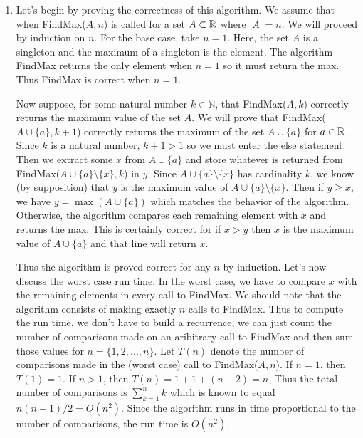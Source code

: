 \documentclass[11pt]{article}
\begin{document}
\begin{enumerate}

\item Let's begin by proving the correctness of this algorithm.
We assume that when FindMax($A, n$) is called for a set $A \subset \mathbb{R}$ where $|A| = n$.
We will proceed by induction on $n$.
For the base case, take $n = 1$.
Here, the set $A$ is a singleton and the maximum of a singleton is the element.
The algorithm FindMax returns the only element when $n=1$ so it must return the max.
Thus FindMax is correct when $n=1$.

Now suppose, for some natural number $k \in \mathbb{N}$, that FindMax($A, k$) correctly returns the maximum value of the set $A$.
We will prove that FindMax($A \cup \{ a \}, k+1$) correctly returns the maximum of the set $A \cup \{ a \}$ for $a \in \mathbb{R}$.
Since $k$ is a natural number, $k+1 > 1$ so we must enter the else statement.
Then we extract some $x$ from $A \cup \{ a \}$ and store whatever is returned from FindMax($A \cup \{ a \} \setminus \{ x \}, k$) in $y$.
Since $ A \cup \{ a \} \setminus \{ x \}$ has cardinality $k$, we know (by supposition) that $y$ is the maximum value of $A \cup \{ a \} \setminus \{ x \}$.
Then if $y \geq x$, we have $y = \max (A \cup \{ a \})$ which matches the behavior of the algorithm.
Otherwise, the algorithm compares each remaining element with $x$ and returns the max.
This is certainly correct for if $x > y$ then $x$ is the maximum value of $A \cup \{ a\}$ and that line will return $x$.

Thus the algorithm is proved correct for any $n$ by induction.
Let's now discuss the worst case run time.
In the worst case, we have to compare $x$ with the remaining elements in every call to FindMax.
We should note that the algorithm consists of making exactly $n$ calls to FindMax.
Thus to compute the run time, we don't have to build a recurrence, we can just count the number of comparisons made on an aribitrary call to FindMax and then sum those values for $n= \{ 1, 2, ..., n \}$.
Let $T(n)$ denote the number of comparisons made in the (worst case) call to FindMax($A, n$).
If $n = 1$, then $T(1) = 1$.
If $n > 1$, then $T(n) = 1 + 1 + (n-2) = n$.
Thus the total number of comparisons is $\sum _{k=1}^n k$ which is known to equal $n(n+1)/2 = O(n^2)$.
Since the algorithm runs in time proportional to the number of comparisons, the run time is $O(n^2)$.


\end{enumerate}
\end{document}
